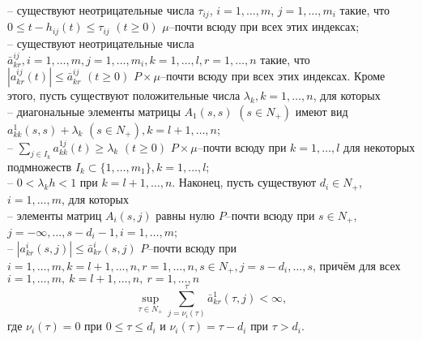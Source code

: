 \noindent
--
существуют неотрицательные числа $\tau_{ij}$, $i = 1,\dots,m$, $j =
1,\dots,m_i$  такие, что  $0 \leq t- h_{ij}(t) \leq \tau _{ij} {\,}
{\,} (t \geq 0)$ $\mu $--почти всюду при всех этих индексах;\\
--  существуют неотрицательные числа $\bar a^{ij}_{kr}, i =
1,\dots,m, j = 1,\dots,m_i, k =1,\dots,l, r = 1,\dots,n$ такие, что
$|a^{ij}_{kr}(t)|\leq \bar a^{ij}_{kr} \,\, (t\geq 0) $
$P\times\mu$--почти всюду при всех этих индексах.
Кроме этого, пусть существуют положительные числа $\lambda _k, k = 1, \dots,
n$, для которых\\
\noindent
  -- диагональные элементы матрицы $ A_1(s,s)$ $(s \in
N_+)$ имеют вид $a_{kk}^{1}(s,s) + \lambda _k \,\, (s \in N_+), k=l
+ 1, \dots, n$;\\
  --  $\sum \limits_{j\in I_k}a^{1j}_{kk}(t)  \geq
\lambda _k \,\, (t\geq 0)$ $P\times\mu$--почти всюду при $k =
1,\dots,l$ для некоторых подмножеств $I_k \subset \{1,\dots, m_1\}, k =
1,\dots, l$;\\
  -- $0 < \lambda _kh < 1$ при $ k = l + 1, \dots, n$.
Наконец, пусть существуют $d_i \in N_+$, $i = 1,\dots,m$, для которых\\
\noindent
 -- элементы матриц
$A_i(s,j)$ равны нулю $P$--почти всюду при $s \in N_+$,
$j=-\infty,\dots,s-d_i-1, i=1,\dots,m$;\\
--  $|a^i_{kr}(s,j)| \leq \bar a^i_{kr}(s,j)$ $P$--почти
всюду при $i=1,\dots,m, k = l+1, \dots, n, r = 1,\dots,n, s\in N_+,
j=s-d_i,\dots,s$, причём для всех $i= 1,\dots,m, \ k = l+1, \dots, n, \ r
= 1,\dots,n$
$$\mathrel {\mathop {\sup}
\limits _{\tau \in N_+}}\sum \limits _{j=\nu _i (\tau)}^{\tau}\bar
a^{1}_{kr}(\tau,j) < \infty, $$ где $\nu _i (\tau) = 0$ при $0 \le
\tau \le d_i$ и  $\nu _i (\tau) = \tau - d_i$ при $\tau
> d_i$.

